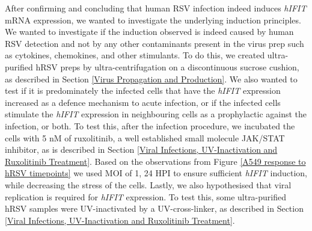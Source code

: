 After confirming and concluding that human RSV infection indeed induces \textit{hIFIT} mRNA expression, we wanted to investigate the underlying induction principles. We wanted to investigate if the induction observed is indeed caused by human RSV detection and not by any other contaminants present in the virus prep such as cytokines, chemokines, and other stimulants. To do this, we created ultra-purified hRSV preps by ultra-centrifugation on a discontinuous sucrose cushion, as described in Section \ref{Virus Propagation and Production}. We also wanted to test if it is predominately the infected cells that have the \textit{hIFIT} expression increased as a defence mechanism to acute infection, or if the infected cells stimulate the \textit{hIFIT} expression in neighbouring cells as a prophylactic against the infection, or both. To test this, after the infection procedure, we incubated the cells with 5 nM of ruxolitinib, a well established small molecule JAK/STAT inhibitor, as is described in Section \ref{Viral Infections, UV-Inactivation and Ruxolitinib Treatment}. Based on the observations from Figure \ref{A549 response to hRSV timepoints} we used MOI of 1, 24 HPI to ensure sufficient \textit{hIFIT} induction, while decreasing the stress of the cells.  Lastly, we also hypothesised that viral replication is required for \textit{hIFIT} expression. To test this, some ultra-purified hRSV samples were UV-inactivated by a UV-cross-linker, as described in Section \ref{Viral Infections, UV-Inactivation and Ruxolitinib Treatment}.

